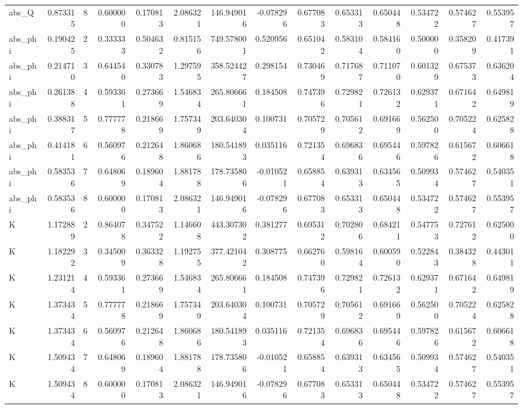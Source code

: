 \begin{tabular}{lrrrrrrrrrrrrr}
abs\_Q & 0.873315 & 8 & 0.600000 & 0.170813 & 2.086321 & 146.949016 & -0.078296 & 0.677083 & 0.653313 & 0.650448 & 0.534722 & 0.574627 & 0.553957 \\
abs\_phi & 0.190425 & 2 & 0.333333 & 0.504632 & 0.815156 & 749.578001 & 0.520956 & 0.651042 & 0.583104 & 0.584160 & 0.500000 & 0.358209 & 0.417391 \\
abs\_phi & 0.214710 & 3 & 0.644540 & 0.330783 & 1.297595 & 358.524427 & 0.298154 & 0.730469 & 0.717687 & 0.711070 & 0.601329 & 0.675373 & 0.636204 \\
abs\_phi & 0.261388 & 4 & 0.593361 & 0.273669 & 1.546834 & 265.806661 & 0.184508 & 0.747396 & 0.729821 & 0.726132 & 0.629371 & 0.671642 & 0.649819 \\
abs\_phi & 0.388317 & 5 & 0.777778 & 0.218669 & 1.757349 & 203.640304 & 0.100731 & 0.705729 & 0.705612 & 0.691669 & 0.562500 & 0.705224 & 0.625828 \\
abs\_phi & 0.414181 & 6 & 0.560976 & 0.212648 & 1.860686 & 180.541893 & 0.035116 & 0.721354 & 0.696836 & 0.695446 & 0.597826 & 0.615672 & 0.606618 \\
abs\_phi & 0.583536 & 7 & 0.648069 & 0.189604 & 1.881788 & 178.735806 & -0.010521 & 0.658854 & 0.639313 & 0.634565 & 0.509934 & 0.574627 & 0.540351 \\
abs\_phi & 0.583536 & 8 & 0.600000 & 0.170813 & 2.086321 & 146.949016 & -0.078296 & 0.677083 & 0.653313 & 0.650448 & 0.534722 & 0.574627 & 0.553957 \\
K & 1.172889 & 2 & 0.864078 & 0.347522 & 1.146608 & 443.307302 & 0.381277 & 0.695312 & 0.702806 & 0.684211 & 0.547753 & 0.727612 & 0.625000 \\
K & 1.182292 & 3 & 0.345009 & 0.363328 & 1.192755 & 377.421042 & 0.308775 & 0.662760 & 0.598164 & 0.600590 & 0.522843 & 0.384328 & 0.443011 \\
K & 1.231214 & 4 & 0.593361 & 0.273669 & 1.546834 & 265.806661 & 0.184508 & 0.747396 & 0.729821 & 0.726132 & 0.629371 & 0.671642 & 0.649819 \\
K & 1.373434 & 5 & 0.777778 & 0.218669 & 1.757349 & 203.640304 & 0.100731 & 0.705729 & 0.705612 & 0.691669 & 0.562500 & 0.705224 & 0.625828 \\
K & 1.373434 & 6 & 0.560976 & 0.212648 & 1.860686 & 180.541893 & 0.035116 & 0.721354 & 0.696836 & 0.695446 & 0.597826 & 0.615672 & 0.606618 \\
K & 1.509434 & 7 & 0.648069 & 0.189604 & 1.881788 & 178.735806 & -0.010521 & 0.658854 & 0.639313 & 0.634565 & 0.509934 & 0.574627 & 0.540351 \\
K & 1.509434 & 8 & 0.600000 & 0.170813 & 2.086321 & 146.949016 & -0.078296 & 0.677083 & 0.653313 & 0.650448 & 0.534722 & 0.574627 & 0.553957 \\
\bottomrule
\end{tabular}
